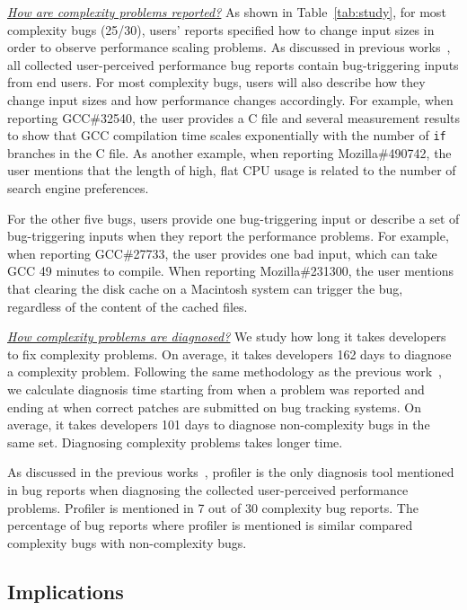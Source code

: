 {\underline{\textit{How are complexity problems reported?}}
As shown in Table~\ref{tab:study},
for most complexity bugs (25/30), 
users' reports specified how to change input sizes 
in order to observe performance scaling problems. 
As discussed in previous works~\cite{SongOOPSLA2014}, 
all collected user-perceived performance bug reports
contain bug-triggering inputs from end users. 
For most complexity bugs, 
users will also describe how they change input sizes 
and how performance changes accordingly. 
For example, when reporting GCC\#32540, 
the user provides a C file and several measurement results to 
show that GCC compilation time scales exponentially 
with the number of \texttt{if} branches in the C file. 
As another example, when reporting Mozilla\#490742, 
the user mentions that the length of high, 
flat CPU usage is related to the number of search engine preferences. 

For the other five bugs, users provide one bug-triggering input 
or describe a set of bug-triggering inputs when they report the performance problems. 
For example, when reporting GCC\#27733, 
the user provides one bad input, which can take GCC 49 minutes to compile. 
When reporting Mozilla\#231300, the user mentions that clearing the disk cache on a Macintosh system can trigger the bug, 
regardless of the content of the cached files. 


{\underline{\textit{How complexity problems are diagnosed?}}
We study how long it takes developers to fix complexity problems. 
On average, it takes developers 162 days to diagnose a complexity problem. 
Following the same methodology as the previous work~\cite{SongOOPSLA2014},
we calculate diagnosis time starting from when a problem was reported 
and ending at when correct patches are submitted on bug tracking systems. 
On average, it takes developers 101 days to diagnose non-complexity bugs in the same set. 
Diagnosing complexity problems takes longer time. 


As discussed in the previous works~\cite{SongOOPSLA2014}, 
profiler is the only diagnosis tool mentioned in bug reports 
when diagnosing the collected user-perceived performance problems. 
Profiler is mentioned in 7 out of 30 complexity bug reports. 
The percentage of bug reports where profiler is mentioned 
is similar compared complexity bugs with non-complexity bugs. 


\subsection{Implications}


}}
